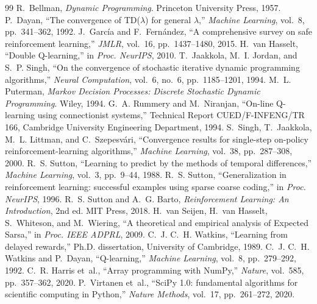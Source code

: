 \begin{thebibliography}{99}
 R.~Bellman, \textit{Dynamic Programming}. Princeton University Press, 1957.
 P.~Dayan, ``The convergence of TD($\lambda$) for general $\lambda$,'' \textit{Machine Learning}, vol.~8, pp.~341--362, 1992.
 J.~Garc\'ia and F.~Fern\'andez, ``A comprehensive survey on safe reinforcement learning,'' \textit{JMLR}, vol.~16, pp.~1437--1480, 2015.
 H.~van Hasselt, ``Double Q-learning,'' in \textit{Proc. NeurIPS}, 2010.
 T.~Jaakkola, M.~I. Jordan, and S.~P. Singh, ``On the convergence of stochastic iterative dynamic programming algorithms,'' \textit{Neural Computation}, vol.~6, no.~6, pp.~1185--1201, 1994.
 M.~L. Puterman, \textit{Markov Decision Processes: Discrete Stochastic Dynamic Programming}. Wiley, 1994.
 G.~A. Rummery and M.~Niranjan, ``On-line Q-learning using connectionist systems,'' Technical Report CUED/F-INFENG/TR 166, Cambridge University Engineering Department, 1994.
 S.~Singh, T.~Jaakkola, M.~L. Littman, and C.~Szepesv\'ari, ``Convergence results for single-step on-policy reinforcement-learning algorithms,'' \textit{Machine Learning}, vol.~38, pp.~287--308, 2000.
 R.~S. Sutton, ``Learning to predict by the methods of temporal differences,'' \textit{Machine Learning}, vol.~3, pp.~9--44, 1988.
 R.~S. Sutton, ``Generalization in reinforcement learning: successful examples using sparse coarse coding,'' in \textit{Proc. NeurIPS}, 1996.
 R.~S. Sutton and A.~G. Barto, \textit{Reinforcement Learning: An Introduction}, 2nd ed. MIT Press, 2018.
 H.~van Seijen, H.~van Hasselt, S.~Whiteson, and M.~Wiering, ``A theoretical and empirical analysis of Expected Sarsa,'' in \textit{Proc. IEEE ADPRL}, 2009.
 C.~J. C.~H. Watkins, ``Learning from delayed rewards,'' Ph.D. dissertation, University of Cambridge, 1989.
 C.~J. C.~H. Watkins and P.~Dayan, ``Q-learning,'' \textit{Machine Learning}, vol.~8, pp.~279--292, 1992.
 C.~R. Harris et~al., ``Array programming with NumPy,'' \textit{Nature}, vol.~585, pp.~357--362, 2020.
 P.~Virtanen et~al., ``SciPy 1.0: fundamental algorithms for scientific computing in Python,'' \textit{Nature Methods}, vol.~17, pp.~261--272, 2020.
\end{thebibliography}
